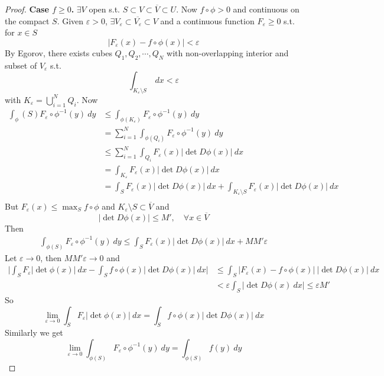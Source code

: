 \documentclass[11pt,a4paper]{article}
\theoremstyle{definition}
\theoremstyle{plain}
\theoremstyle{remark}
\newcommand{\abs}[1]{\lvert #1 \rvert}
\begin{document}
\begin{proof}
    \textbf{Case $f \ge 0$.} $\exists V$ open s.t. $S \subset V \subset \overline{V} \subset U$. 
    Now $f \circ \phi > 0$ and continuous on the compact $S$. Given $\varepsilon > 0$, $\exists V_\varepsilon \subset \overline{V_\varepsilon} \subset V$
    and a continuous function $F_\varepsilon \ge 0$ s.t. for $x \in S$
    $$\abs{F_\varepsilon(x) - f \circ \phi(x)} < \varepsilon$$
    By Egorov, there exists cubes $Q_1, Q_2, \cdots, Q_N$ with non-overlapping interior and subset of $V_\varepsilon$ 
    s.t. 
    $$\int_{K_\varepsilon \setminus S} \ dx < \varepsilon$$
    with $K_\varepsilon = \bigcup_{i=1}^N Q_i$. Now 
    \begin{align*}
        \int_\phi(S) F_\varepsilon \circ \phi^{-1} (y) \ dy &\le \int_{\phi(K_\varepsilon)} F_\varepsilon \circ \phi^{-1} (y) \ dy \\
        &= \sum_{i=1}^N \int_{\phi(Q_i)} F_\varepsilon \circ \phi^{-1} (y) \ dy \\
        &\le \sum_{i=1}^N \int_{Q_i} F_\varepsilon (x) \abs{\det D\phi(x)} \ dx \\
        &= \int_{K_\varepsilon} F_\varepsilon (x) \abs{\det D\phi(x)} \ dx \\
        &= \int_S F_\varepsilon (x) \abs{\det D\phi(x)} \ dx + \int_{K_\varepsilon \setminus S} F_\varepsilon(x) \abs{\det D\phi(x)} \ dx\\
    \end{align*}
    But $F_\varepsilon (x) \le \max_S f \circ \phi$ and $K_\varepsilon \setminus S \subset \overline{V}$ and 
    $$\abs{\det D\phi(x)} \le M', \quad \forall x \in \overline{V}$$
    Then 
    \begin{align*}
        \int_{\phi(S)} F_\varepsilon \circ \phi^{-1} (y) \ dy \le \int_S F_\varepsilon(x) \abs{\det D\phi(x)} \ dx + MM' \varepsilon
    \end{align*}
    Let $\varepsilon \to 0$, then $M M' \varepsilon \to 0$ and 
    \begin{align*}
        \abs{\int_S F_\varepsilon \abs{\det \phi(x)} \ dx - \int_S f \circ \phi(x) \abs{\det D\phi(x)} \ dx} &\le \int_S \abs{F_\varepsilon(x) - f \circ \phi(x)} \ \abs{\det D\phi(x)} \ dx \\
        &< \varepsilon \int_S \abs{\det D\phi(x) \ dx} \le \varepsilon M'
    \end{align*}
    So 
    $$\lim_{\varepsilon \to 0} \int_S F_\varepsilon \abs{\det \phi(x)} \ dx = \int_S f \circ \phi(x) \abs{\det D\phi(x)} \ dx$$
    Similarly we get 
    $$\lim_{\varepsilon \to 0} \int_{\phi(S)} F_\varepsilon \circ \phi^{-1} (y) \ dy = \int_{\phi(S)} f(y) \ dy$$


\end{proof}
\end{document}
